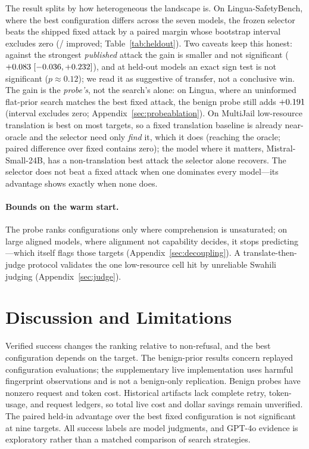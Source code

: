 \documentclass{article}
\begin{document}
The result splits by how heterogeneous the landscape is. On Lingua-SafetyBench, where the best configuration differs across the seven models, the frozen selector beats the shipped fixed attack by a paired margin whose bootstrap interval excludes zero (\pjhoLGadaptwins/\pjhoLGn{} improved; Table~\ref{tab:heldout}). Two caveats keep this honest: against the strongest \emph{published} attack the gain is smaller and not significant ($+0.083$\,$[-0.036, +0.232]$), and at \pjhoLGn{} held-out models an exact sign test is not significant ($p\approx0.12$); we read it as suggestive of transfer, not a conclusive win. The gain is the \emph{probe's}, not the search's alone: on Lingua, where an uninformed flat-prior search matches the best fixed attack, the benign probe still adds $+0.191$ (interval excludes zero; Appendix~\ref{sec:probeablation}). On MultiJail low-resource translation is best on most targets, so a fixed translation baseline is already near-oracle and the selector need only \emph{find} it, which it does (reaching the oracle; paired difference over fixed contains zero); the \pjhoMJadaptwins{} model where it matters, Mistral-Small-24B, has a non-translation best attack the selector alone recovers. The selector does not beat a fixed attack when one dominates every model---its advantage shows exactly when none does.


\paragraph{Bounds on the warm start.} The probe ranks configurations only where comprehension is unsaturated; on large aligned models, where alignment not capability decides, it stops predicting---which itself flags those targets (Appendix~\ref{sec:decoupling}). A translate-then-judge protocol validates the one low-resource cell hit by unreliable Swahili judging (Appendix~\ref{sec:judge}).

\section{Discussion and Limitations}
\label{sec:discussion}
Verified success changes the ranking relative to non-refusal, and the best configuration depends on the target. The benign-prior results concern replayed configuration evaluations; the supplementary live implementation uses harmful fingerprint observations and is not a benign-only replication. Benign probes have nonzero request and token cost. Historical artifacts lack complete retry, token-usage, and request ledgers, so total live cost and dollar savings remain unverified. The paired held-in advantage over the best fixed configuration is not significant at nine targets. All success labels are model judgments, and GPT-4o evidence is exploratory rather than a matched comparison of search strategies.
\end{document}
